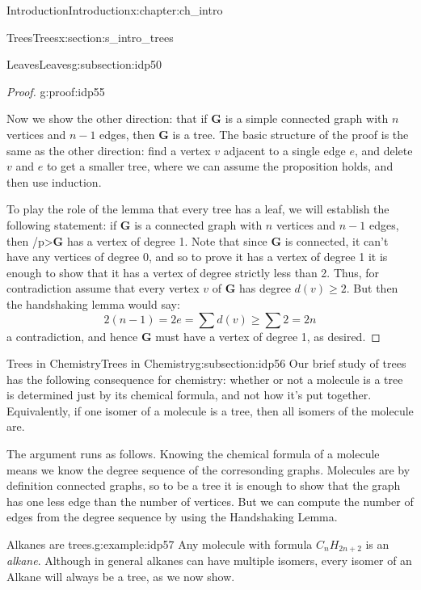 \documentclass[oneside,10pt,]{book}
\numberwithin{equation}{section}
\newcommand{\bfG}{\mathbf{G}}
\begin{document}
\begin{chapterptx}{Introduction}{}{Introduction}{}{}{x:chapter:ch_intro}
\begin{sectionptx}{Trees}{}{Trees}{}{}{x:section:s_intro_trees}
\begin{subsectionptx}{Leaves}{}{Leaves}{}{}{g:subsection:idp50}
\begin{proof}{}{g:proof:idp55}
\par
Now we show the other direction: that if \(\bfG\) is a simple connected graph with \(n\) vertices and \(n-1\) edges,  then \(\bfG\) is a tree.  The basic structure of the proof is the same as the other direction: find a vertex \(v\) adjacent to a single edge \(e\), and delete \(v\) and \(e\) to get a smaller tree, where we can assume the proposition holds, and then use induction.%
\par
To play the role of the lemma that every tree has a leaf, we will establish the following statement:  if \(\bfG\) is a connected graph with \(n\) vertices and \(n-1\) edges, then \slash{}p\textgreater{}\(\bfG\) has a vertex of degree 1.  Note that since \(\bfG\) is connected, it can't have any vertices of degree 0, and so to prove it has a vertex of degree 1 it is enough to show that it has a vertex of degree strictly less than 2.  Thus, for contradiction assume that every vertex \(v\) of \(\bfG\) has degree \(d(v)\geq 2\).  But then the handshaking lemma would say:%
\begin{equation*}
2(n-1)=2e=\sum d(v)\geq \sum 2=2n
\end{equation*}
a contradiction, and hence \(\bfG\) must have a vertex of degree 1, as desired.%
\end{proof}
\end{subsectionptx}
%
%
\typeout{************************************************}
\typeout{************************************************}
%
\begin{subsectionptx}{Trees in Chemistry}{}{Trees in Chemistry}{}{}{g:subsection:idp56}
Our brief study of trees has the following consequence for chemistry: whether or not a molecule is a tree is determined just by its chemical formula, and not how it's put together.  Equivalently, if one isomer of a molecule is a tree, then all isomers of the molecule are.%
\par
The argument runs as follows.   Knowing the chemical formula of a molecule means we know the degree sequence of the corresonding graphs.  Molecules are by definition connected graphs, so to be a tree it is enough to show that the graph has one less edge than the number of vertices.  But we can compute the number of edges from the degree sequence by using the Handshaking Lemma.%
\begin{example}{Alkanes are trees.}{g:example:idp57}%
Any molecule with formula \(C_nH_{2n+2}\) is an \emph{alkane}.  Although in general alkanes can have multiple isomers, every isomer of an Alkane will always be a tree, as we now show.%

\end{example}
\end{subsectionptx}
\end{sectionptx}
\end{chapterptx}
\end{document}
